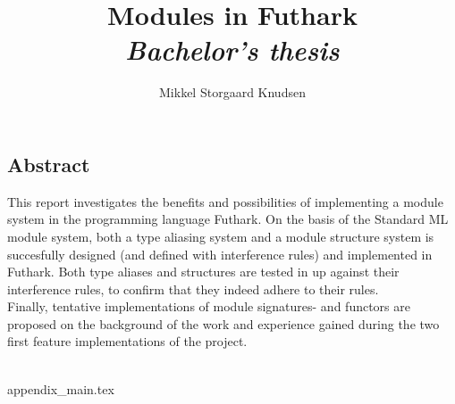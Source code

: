 \documentclass[12pt]{article}
\title{
  Modules in Futhark \\
\textit{Bachelor's thesis}
}
\author{Mikkel Storgaard Knudsen}
\begin{document}
\maketitle

\subsection*{Abstract}
\label{subsec:abstract}
This report investigates the benefits and possibilities of implementing a module system in the programming language Futhark. On the basis of the Standard ML module system, both a type aliasing system and a module structure system is succesfully designed (and defined with interference rules) and implemented in Futhark.
Both type aliases and structures are tested in up against their interference rules, to confirm that they indeed adhere to their rules.\\
Finally, tentative implementations of module signatures- and functors are proposed on the background of the work and experience gained during the two first feature implementations of the project.
\\\\
\clearpage
\tableofcontents
\clearpage

\clearpage

\clearpage

\clearpage

\clearpage

\clearpage









{appendix_main.tex}




\end{document}

